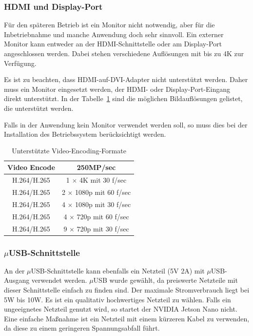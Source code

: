 \subsubsection{HDMI und Display-Port}

Für den späteren Betrieb ist ein Monitor nicht notwendig, aber für die Inbetriebnahme 
und manche Anwendung doch sehr sinnvoll. Ein externer Monitor kann entweder an der 
HDMI-Schnittstelle oder am Display-Port angeschlossen werden. Dabei stehen verschiedene Auflösungen mit bis zu 4K zur Verfügung.

Es ist zu beachten, dass HDMI-auf-DVI-Adapter nicht unterstützt werden. Daher muss ein
Monitor eingesetzt werden, der HDMI- oder Display-Port-Eingang direkt unterstützt. In der Tabelle~\ref{Jetson:Aufloesungen}
sind die   möglichen Bildauflösungen gelistet, die unterstützt werden.

Falls in der Anwendung kein Monitor verwendet werden soll, so muss dies bei der Installation des Betriebssystem berücksichtigt werden.



\begin{table}
  \centering
  \begin{tabular}{cc}
    \textbf{Video Encode}  & \textbf{250MP/sec} \\   \hline
     H.264/H.265           & 1 $\times$  4K mit  30 f/sec \\
     H.264/H.265	       & 2 $\times$ 1080p mit 60 f/sec \\
     H.264/H.265	       & 4 $\times$ 1080p mit 30 f/sec \\
     H.264/H.265	       & 4 $\times$ 720p mit 60 f/sec  \\
     H.264/H.265	       & 9 $\times$ 720p mit 30 f/sec \\
  \end{tabular}
 \caption{Unterstützte Video-Encoding-Formate}\label{Jetson:Aufloesungen}
\end{table}



\subsubsection{$\mu$USB-Schnittstelle}


An der $\mu$USB-Schnittstelle kann ebenfalls ein Netzteil (5V\textdirectcurrent{} 2A) mit $\mu$USB-Ausgang
verwendet werden. $\mu$USB wurde gewählt, da preiswerte Netzteile mit dieser Schnittstelle einfach zu finden sind. Der maximale Stromverbrauch liegt bei 5W bis 10W. Es ist ein qualitativ hochwertiges Netzteil zu wählen. Falls ein ungeeignetes Netzteil genutzt wird, so startet der NVIDIA Jetson Nano nicht. Eine einfache Maßnahme ist ein Netzteil mit einem kürzeren Kabel zu verwenden, da diese zu einem geringeren Spannungsabfall führt.


